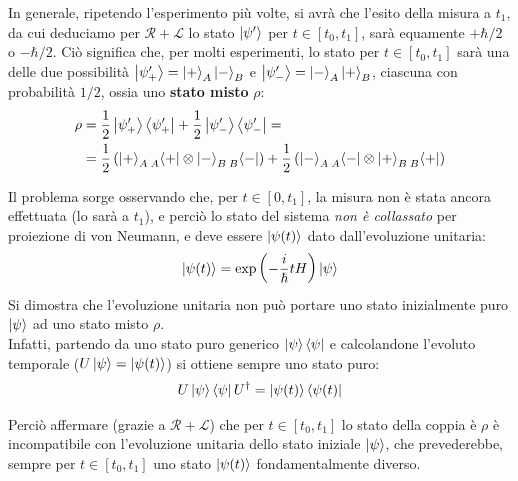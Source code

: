 \documentclass[../../FisicaTeorica.tex]{subfiles}
\begin{document}
In generale, ripetendo l'esperimento più volte, si avrà che l'esito della misura a $t_1$, da cui deduciamo per $\mathcal{R}+\mathcal{L}$ lo stato $\Ket{\psi'}$ per $t\in[t_0,t_1]$, sarà equamente $+\hbar/2$ o $-\hbar/2$. Ciò significa che, per molti esperimenti, lo stato per $t\in[t_0,t_1]$ sarà una  delle due possibilità $\Ket{\psi'_+} = \Ket{+}_A\Ket{-}_B$ e $\Ket{\psi'_-}=\Ket{-}_A\Ket{+}_B$, ciascuna con probabilità $1/2$, ossia uno \textbf{stato misto} $\rho$: 
\begin{align*}
\rho &= \frac{1}{2}\Ket{\psi'_+}\Bra{\psi'_+} + \frac{1}{2}\Ket{\psi'_-}\Bra{\psi'_-}=\\
&=
 \frac{1}{2}\left( \Ket{+}_A \prescript{}{A}{\Bra{+}}
\otimes \Ket{-}_B \prescript{}{B}{\Bra{-}} 
\right)
+ \frac{1}{2} \left(\Ket{-}_A \prescript{}{A}{\Bra{-}}\otimes \Ket{+}_{B}\prescript{}{B}{\Bra{+}}\right)
\end{align*}

Il problema sorge osservando che, per $t \in [0,t_1]$, la misura non è stata ancora effettuata (lo sarà a $t_1$), e perciò lo stato del sistema \textit{non è collassato} per proiezione di von Neumann, e deve essere $\Ket{\psi(t)}$ dato dall'evoluzione unitaria:
\begin{align*}
\Ket{\psi(t)} = \exp\left(-\frac{i}{\hbar}tH\right)\Ket{\psi}
\end{align*}
Si dimostra che l'evoluzione unitaria non può portare uno stato inizialmente puro $\Ket{\psi}$ ad uno stato misto $\rho$.\\
Infatti, partendo da uno stato puro generico $\Ket{\psi}\Bra{\psi}$ e calcolandone l'evoluto temporale ($U\Ket{\psi}=\Ket{\psi(t)}$) si ottiene sempre uno stato puro:
\begin{align*}
U\Ket{\psi}\Bra{\psi}U^\dag = \Ket{\psi(t)}\Bra{\psi(t)}
\end{align*}

Perciò affermare (grazie a $\mathcal{R}+\mathcal{L}$) che per $t\in [t_0,t_1]$ lo stato della coppia è $\rho$ è incompatibile con l'evoluzione unitaria dello stato iniziale $\Ket{\psi}$, che prevederebbe, sempre per $t\in[t_0, t_1]$ uno stato $\Ket{\psi(t)}$ fondamentalmente diverso.\\
\end{document}
